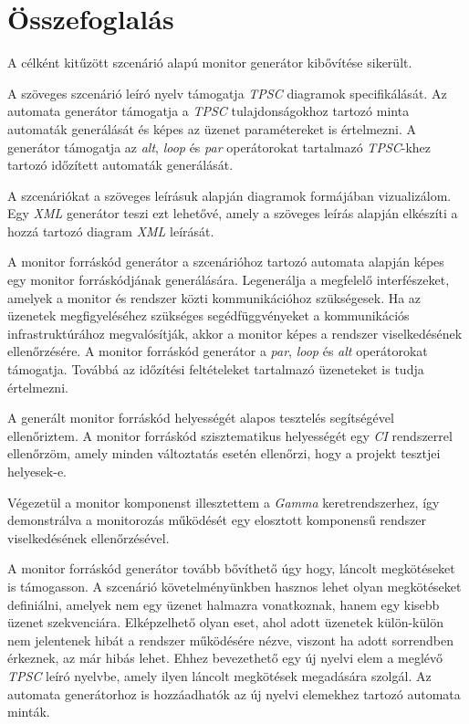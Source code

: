 \chapter{Összefoglalás}

A célként kitűzött szcenárió alapú monitor generátor kibővítése sikerült.

A szöveges szcenárió leíró nyelv támogatja \textit{TPSC} diagramok specifikálását.
Az automata generátor támogatja a \textit{TPSC} tulajdonságokhoz tartozó minta automaták generálását és képes az üzenet paramétereket is értelmezni.
A generátor támogatja az \textit{alt}, \textit{loop} és \textit{par} operátorokat tartalmazó \textit{TPSC}-khez tartozó időzített automaták generálását.

A szcenáriókat a szöveges leírásuk alapján diagramok formájában vizualizálom.
Egy \textit{XML} generátor teszi ezt lehetővé, amely a szöveges leírás alapján elkészíti a hozzá tartozó diagram \textit{XML} leírását.

A monitor forráskód generátor a szcenárióhoz tartozó automata alapján képes egy monitor forráskódjának generálására.
Legenerálja a megfelelő interfészeket, amelyek a monitor és rendszer közti kommunikációhoz szükségesek.
Ha az üzenetek megfigyeléséhez szükséges segédfüggvényeket a kommunikációs infrastruktúrához megvalósítják, akkor a monitor képes a rendszer viselkedésének ellenőrzésére.
A monitor forráskód generátor a \textit{par}, \textit{loop} és \textit{alt} operátorokat támogatja.
Továbbá az időzítési feltételeket tartalmazó üzeneteket is tudja értelmezni.

A generált monitor forráskód helyességét alapos tesztelés segítségével ellenőriztem.
A monitor forráskód szisztematikus helyességét egy \textit{CI} rendszerrel ellenőrzöm, amely minden változtatás esetén ellenőrzi, hogy a projekt tesztjei helyesek-e.

Végezetül a monitor komponenst illesztettem a \textit{Gamma} keretrendszerhez, így demonstrálva a monitorozás működését egy elosztott komponensű rendszer viselkedésének ellenőrzésével.

A monitor forráskód generátor tovább bővíthető úgy hogy, láncolt megkötéseket is támogasson.
A szcenárió követelményünkben hasznos lehet olyan megkötéseket definiálni, amelyek nem egy üzenet halmazra vonatkoznak, hanem egy kisebb üzenet szekvenciára.
Elképzelhető olyan eset, ahol adott üzenetek külön-külön nem jelentenek hibát a rendszer működésére nézve, viszont ha adott sorrendben érkeznek, az már hibás lehet.
Ehhez bevezethető egy új nyelvi elem a meglévő \textit{TPSC} leíró nyelvbe, amely ilyen láncolt megkötések megadására szolgál.
Az automata generátorhoz is hozzáadhatók az új nyelvi elemekhez tartozó automata minták.